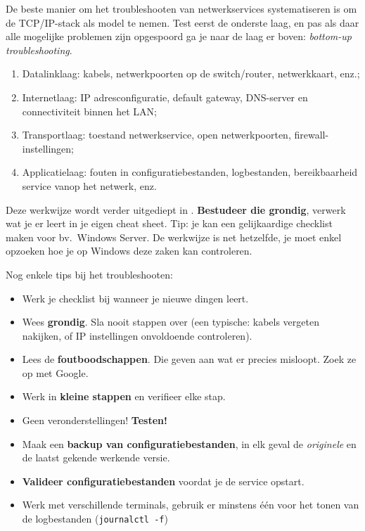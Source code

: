 De beste manier om het troubleshooten van netwerkservices systematiseren is om de TCP/IP-stack als model te nemen. Test eerst de onderste laag, en pas als daar alle mogelijke problemen zijn opgespoord ga je naar de laag er boven: \emph{bottom-up troubleshooting}.

\begin{enumerate}
  \item Datalinklaag: kabels, netwerkpoorten op de switch/router, netwerkkaart, enz.;
  \item Internetlaag: IP adresconfiguratie, default gateway, DNS-server en connectiviteit binnen het LAN;
  \item Transportlaag: toestand netwerkservice, open netwerkpoorten, firewall-in\-stel\-lingen;
  \item Applicatielaag: fouten in configuratiebestanden, logbestanden, bereikbaarheid service vanop het netwerk, enz.
\end{enumerate}

Deze werkwijze wordt verder uitgediept in \textcite{VanVreckem2015}. \textbf{Bestudeer die grondig}, verwerk wat je er leert in je eigen cheat sheet. Tip: je kan een gelijkaardige checklist maken voor bv.~Windows Server. De werkwijze is net hetzelfde, je moet enkel opzoeken hoe je op Windows deze zaken kan controleren.

Nog enkele tips bij het troubleshooten:
\begin{itemize}
  \item Werk je checklist bij wanneer je nieuwe dingen leert.
  \item Wees \textbf{grondig}. Sla nooit stappen over (een typische: kabels vergeten nakijken, of IP instellingen onvoldoende controleren).
  \item Lees de \textbf{foutboodschappen}. Die geven aan wat er precies misloopt. Zoek ze op met Google.
  \item Werk in \textbf{kleine stappen} en verifieer elke stap.
  \item Geen veronderstellingen! \textbf{Testen!}
  \item Maak een \textbf{backup van configuratiebestanden}, in elk geval de \emph{originele} en de laatst gekende werkende versie.
  \item \textbf{Valideer configuratiebestanden} voordat je de service opstart.
  \item Werk met verschillende terminals, gebruik er minstens één voor het tonen van de logbestanden (\texttt{journalctl -f})
\end{itemize}

